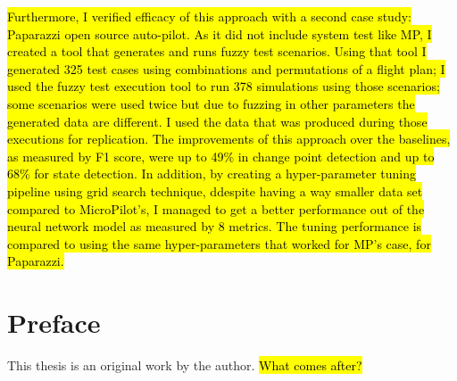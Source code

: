 \hl{Furthermore, I verified efficacy of this approach with a second case study: Paparazzi open source auto-pilot. As it did not include system test like MP, I created a tool that generates and runs fuzzy test scenarios. Using that tool I generated 325 test cases using combinations and permutations of a flight plan; I used the fuzzy test execution tool to run 378 simulations using those scenarios; some scenarios were used twice but due to fuzzing in other parameters the generated data are different. I used the data that was produced during those executions for replication. The improvements of this approach over the baselines, as measured by F1 score, were up to 49\% in change point detection and up to 68\% for state detection.
In addition, by creating a hyper-parameter tuning pipeline using grid search technique, ddespite having a way smaller data set compared to MicroPilot's, I managed to get a better performance out of the neural network model as measured by 8 metrics. The tuning performance is compared to using the same hyper-parameters that worked for MP's case, for Paparazzi.}%




\chapter{Preface}

This thesis is an original work by the author. \hl{What comes after?}


